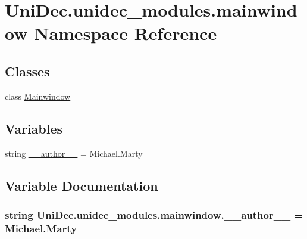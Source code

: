 \hypertarget{namespace_uni_dec_1_1unidec__modules_1_1mainwindow}{}\section{Uni\+Dec.\+unidec\+\_\+modules.\+mainwindow Namespace Reference}
\label{namespace_uni_dec_1_1unidec__modules_1_1mainwindow}
\subsection*{Classes}
\begin{DoxyCompactItemize}
\item 
class \hyperlink{class_uni_dec_1_1unidec__modules_1_1mainwindow_1_1_mainwindow}{Mainwindow}
\end{DoxyCompactItemize}
\subsection*{Variables}
\begin{DoxyCompactItemize}
\item 
string \hyperlink{namespace_uni_dec_1_1unidec__modules_1_1mainwindow_a4bbb132f65b60ca01ff6d887e3295627}{\+\_\+\+\_\+author\+\_\+\+\_\+} = \textquotesingle{}Michael.\+Marty\textquotesingle{}
\end{DoxyCompactItemize}


\subsection{Variable Documentation}
\hypertarget{namespace_uni_dec_1_1unidec__modules_1_1mainwindow_a4bbb132f65b60ca01ff6d887e3295627}{}
\subsubsection[{\+\_\+\+\_\+author\+\_\+\+\_\+}]{\setlength{\rightskip}{0pt plus 5cm}string Uni\+Dec.\+unidec\+\_\+modules.\+mainwindow.\+\_\+\+\_\+author\+\_\+\+\_\+ = \textquotesingle{}Michael.\+Marty\textquotesingle{}}\label{namespace_uni_dec_1_1unidec__modules_1_1mainwindow_a4bbb132f65b60ca01ff6d887e3295627}
